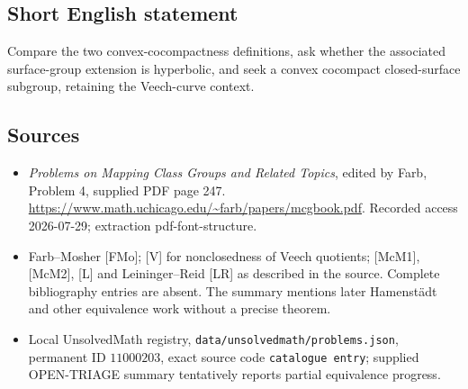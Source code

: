 \documentclass[11pt]{article}
\begin{document}
\subsection{Short English statement}
Compare the two convex-cocompactness definitions, ask whether the associated surface-group extension is hyperbolic, and seek a convex cocompact closed-surface subgroup, retaining the Veech-curve context.
\subsection{Sources}
\begin{itemize}
\item \emph{Problems on Mapping Class Groups and Related Topics}, edited by Farb, Problem 4, supplied PDF page 247. \url{https://www.math.uchicago.edu/~farb/papers/mcgbook.pdf}. Recorded access 2026-07-29; extraction pdf-font-structure.
\item Farb--Mosher [FMo]; [V] for nonclosedness of Veech quotients; [McM1], [McM2], [L] and Leininger--Reid [LR] as described in the source. Complete bibliography entries are absent. The summary mentions later Hamenst\"adt and other equivalence work without a precise theorem.
\item Local UnsolvedMath registry, \texttt{data/unsolvedmath/problems.json}, permanent ID \(11000203\), exact source code \texttt{catalogue entry}; supplied OPEN-TRIAGE summary tentatively reports partial equivalence progress.
\end{itemize}
\end{document}
